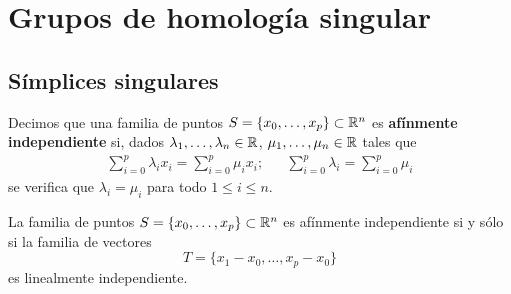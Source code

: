 \setchapterpreamble[u]{\margintoc}

\chapter{Grupos de homología singular}
\section{Símplices singulares}
Decimos que una familia de puntos $S=\{x_0, \dots, x_p\} \subset \mathbb{R}^n$ es
\textbf{afínmente independiente} si, dados $\lambda_1,\dots,\lambda_n \in
\mathbb{R}$, $\mu_1,\dots,\mu_n \in \mathbb{R}$ tales que
\begin{align*}
\sum^p_{i=0}\lambda_ix_i=\sum^p_{i=0}\mu_ix_i;
&&
\sum^p_{i=0}\lambda_i=\sum^p_{i=0}\mu_i
\end {align*}
se verifica que $\lambda_i=\mu_i$ para todo $1\leq i \leq n$.

\begin{proposition}
La familia de puntos $S=\{x_0, \dots, x_p\} \subset \mathbb{R}^n$ es afínmente
independiente si y sólo si la familia de vectores
\[T=\{x_1-x_0,\dots,x_p-x_0\}\]
es linealmente independiente.
\end{proposition}

